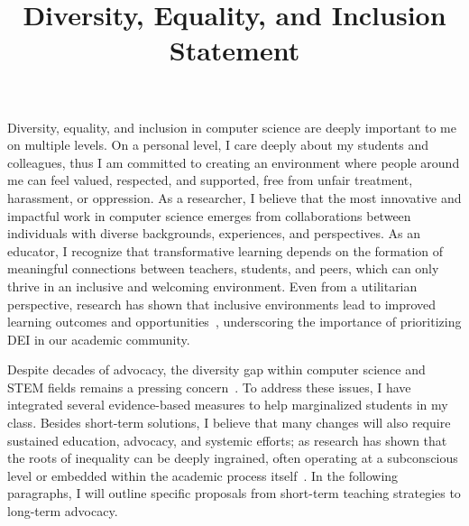 \documentclass[11pt,a4paper,sans]{moderncv}
\title{Diversity, Equality, and Inclusion Statement}
\begin{document}
\makecvtitle

\setlength\parskip{8px}
\vspace{-\parskip} 

Diversity, equality, and inclusion in computer science are deeply important to me on multiple levels. 
On a personal level, I care deeply about my students and colleagues, thus I am committed to creating an environment where people around me can feel valued, respected, and supported, free from unfair treatment, harassment, or oppression. 
As a researcher, I believe that the most innovative and impactful work in computer science emerges from collaborations between individuals with diverse backgrounds, experiences, and perspectives. 
As an educator, I recognize that transformative learning depends on the formation of meaningful connections between teachers, students, and peers, which can only thrive in an inclusive and welcoming environment. 
Even from a utilitarian perspective, research has shown that inclusive environments lead to improved learning outcomes and opportunities~\cite{maruyama_DoesDiversityMake_2000}, underscoring the importance of prioritizing DEI in our academic community.

Despite decades of advocacy, the diversity gap within computer science and STEM fields remains a pressing concern~\cite{_AchievementTrapHow_2007,bowen_CriticalAnalysesOutcomes_2020,bego_DiversityInclusionEngineering_2021a,zhang_MoralImplicationsBeing_2024,miller_TypicalPhysicsPhD_2019}.
To address these issues, I have integrated several evidence-based measures to help marginalized students in my class.
Besides short-term solutions, I believe that many changes will also require sustained education, advocacy, and systemic efforts; as research has shown that the roots of inequality can be deeply ingrained, often operating at a subconscious level or embedded within the academic process itself~\cite{miller_TypicalPhysicsPhD_2019,secules_ZoomingOutStruggling_2018,moss-racusin_ScienceFacultysSubtle_2012,nosek_ImplicitSocialCognitions_2011}. 
In the following paragraphs, I will outline specific proposals from short-term teaching strategies to long-term advocacy.
\end{document}
